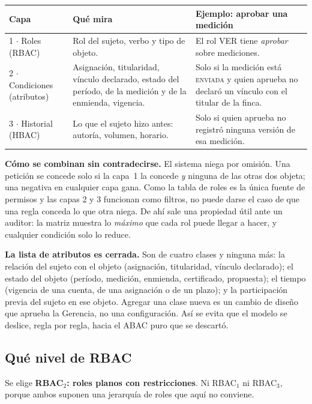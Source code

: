 \documentclass[11pt,letterpaper]{article}
\newcommand{\cab}[1]{\textbf{\rmfamily #1}}
\newcommand{\est}[1]{\textsc{\small #1}}
\begin{document}
\begin{center}
\small
\renewcommand{\arraystretch}{1.25}
\begin{tabularx}{\textwidth}{@{}L{2.5cm} L{4.9cm} Y@{}}
\toprule
\cab{Capa} & \cab{Qué mira} & \cab{Ejemplo: aprobar una medición} \\
 $\cdot$ Roles (RBAC) & Rol del sujeto, verbo y tipo de objeto. & El rol VER tiene \emph{aprobar} sobre mediciones. \\
2 $\cdot$ Condiciones (atributos) & Asignación, titularidad, vínculo declarado, estado del período, de la medición y de la enmienda, vigencia. & Solo si la medición está \est{enviada} y quien aprueba no declaró un vínculo con el titular de la finca. \\
3 $\cdot$ Historial (HBAC) & Lo que el sujeto hizo antes: autoría, volumen, horario. & Solo si quien aprueba no registró ninguna versión de esa medición. \\
\bottomrule
\end{tabularx}
\end{center}

\textbf{Cómo se combinan sin contradecirse.} El sistema niega por omisión. Una petición se concede solo
si la capa~1 la concede \emph{y} ninguna de las otras dos objeta; una negativa en cualquier capa gana.
Como la tabla de roles es la única fuente de permisos y las capas 2 y 3 funcionan como filtros, no
puede darse el caso de que una regla conceda lo que otra niega. De ahí sale una propiedad útil ante un
auditor: la matriz muestra lo \emph{máximo} que cada rol puede llegar a hacer, y cualquier condición
solo lo reduce.

\textbf{La lista de atributos es cerrada.} Son de cuatro clases y ninguna más: la relación del sujeto con
el objeto (asignación, titularidad, vínculo declarado); el estado del objeto (período, medición,
enmienda, certificado, propuesta); el tiempo (vigencia de una cuenta, de una asignación o de un
plazo); y la participación previa del sujeto en ese objeto. Agregar una clase nueva es un cambio de
diseño que aprueba la Gerencia, no una configuración. Así se evita que el modelo se deslice, regla por
regla, hacia el ABAC puro que se descartó.

\subsection{Qué nivel de RBAC}
\label{sec:nivel}

Se elige \textbf{RBAC$_2$: roles planos con restricciones}. Ni RBAC$_1$ ni RBAC$_3$, porque ambos
suponen una jerarquía de roles que aquí no conviene.
\end{document}
